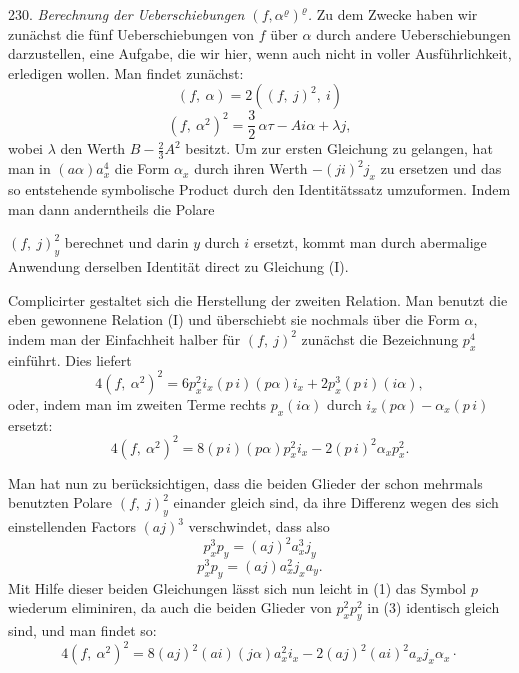 \documentclass[11pt]{article}
\providecommand{\weberpage}[1]{}
\providecommand{\weq}[2]{\begin{equation}\tag{#1}#2\end{equation}}
\begin{document}
230. \textit{Berechnung der Ueberschiebungen $(f, \alpha^{\varrho})^{\varrho}$.} Zu dem Zwecke
haben wir zunächst die fünf Ueberschiebungen von $f$ über $\alpha$ durch
andere Ueberschiebungen darzustellen, eine Aufgabe, die wir hier,
wenn auch nicht in voller Ausführlichkeit, erledigen wollen. Man
findet zunächst:
\weq{I}{(f,\ \alpha) = 2\left((f,\ j)^2,\ i\right)}
\weq{II}{(f,\ \alpha^2)^2 = \frac{3}{2}\,\alpha\tau - Ai\alpha + \lambda j,}
wobei $\lambda$ den Werth $B - \frac{2}{3}A^2$ besitzt. Um zur ersten Gleichung zu
gelangen, hat man in $(a\alpha)a_x^4$ die Form $\alpha_x$ durch ihren Werth
$-(ji)^2 j_x$ zu ersetzen und das so entstehende symbolische Product durch
den Identitätssatz umzuformen. Indem man dann anderntheils die Polare


\weberpage{255}

$(f,\ j)_y^2$ berechnet und darin $y$ durch $i$ ersetzt, kommt man durch abermalige
Anwendung derselben Identität direct zu Gleichung (I).

Complicirter gestaltet sich die Herstellung der zweiten Relation.
Man benutzt die eben gewonnene Relation (I) und überschiebt sie
nochmals über die Form $\alpha$, indem man der Einfachheit halber für
$(f,\ j)^2$ zunächst die Bezeichnung $p_x^4$ einführt. Dies liefert
\[
4(f,\ \alpha^2)^2 = 6p_x^2 i_x (p\,i)(p\alpha) i_x + 2p_x^3(p\,i)(i\alpha),
\]
oder, indem man im zweiten Terme rechts $p_x(i\alpha)$ durch $i_x(p\alpha) - \alpha_x(p\,i)$
ersetzt:
\weq{1}{4(f,\ \alpha^2)^2 = 8(p\,i)(p\alpha)p_x^2 i_x - 2(p\,i)^2 \alpha_x p_x^2.}

Man hat nun zu berücksichtigen, dass die beiden Glieder der schon
mehrmals benutzten Polare $(f,\ j)_y^2$ einander gleich sind, da ihre Differenz
wegen des sich einstellenden Factors $(aj)^3$ verschwindet, dass also
\weq{2}{p_x^3 p_y = (aj)^2 a_x^3 j_y}
\weq{3}{p_x^3 p_y = (aj) a_x^2 j_x a_y.}
Mit Hilfe dieser beiden Gleichungen lässt sich nun leicht in (1) das
Symbol $p$ wiederum eliminiren, da auch die beiden Glieder von $p_x^2 p_y^2$
in (3) identisch gleich sind, und man findet so:
\weq{4}{4(f,\ \alpha^2)^2 = 8(aj)^2(ai)(j\alpha)a_x^2 i_x - 2(aj)^2(ai)^2 a_x j_x \alpha_x \cdot}
\end{document}
